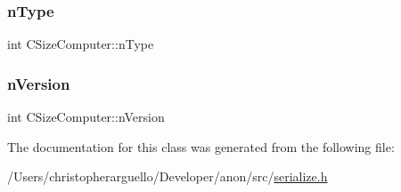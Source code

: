 \subsubsection{\texorpdfstring{n\+Type}{nType}}
{\footnotesize\ttfamily int C\+Size\+Computer\+::n\+Type}

\mbox{\label{class_c_size_computer_a25759db1089e475fcba2f408633dc7bf}} 
\subsubsection{\texorpdfstring{n\+Version}{nVersion}}
{\footnotesize\ttfamily int C\+Size\+Computer\+::n\+Version}



The documentation for this class was generated from the following file\+:\begin{DoxyCompactItemize}
\item 
/\+Users/christopherarguello/\+Developer/anon/src/\mbox{\hyperlink{serialize_8h}{serialize.\+h}}\end{DoxyCompactItemize}

